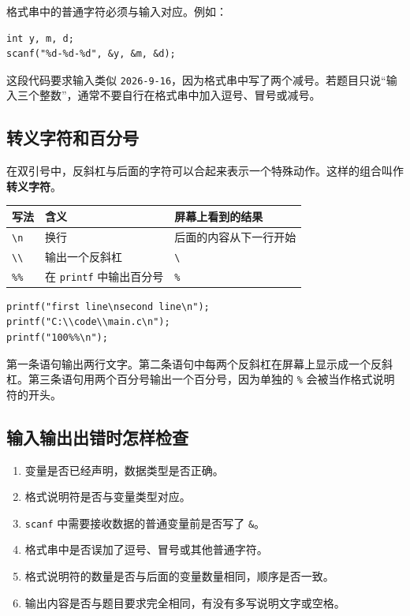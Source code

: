 \documentclass[UTF8,zihao=-4,fontset=windows]{ctexart}
\newcommand{\term}[1]{\textbf{\color{navy}#1}}
\begin{document}
格式串中的普通字符必须与输入对应。例如：
\begin{lstlisting}[style=cstyle]
int y, m, d;
scanf("%d-%d-%d", &y, &m, &d);
\end{lstlisting}

这段代码要求输入类似 \verb|2026-9-16|，因为格式串中写了两个减号。若题目只说“输入三个整数”，通常不要自行在格式串中加入逗号、冒号或减号。

\subsection{转义字符和百分号}

在双引号中，反斜杠与后面的字符可以合起来表示一个特殊动作。这样的组合叫作\term{转义字符}。

\begin{center}
\begin{tabularx}{0.84\textwidth}{>{\centering\arraybackslash}p{2.5cm} X X}
\toprule
写法 & 含义 & 屏幕上看到的结果 \\
\midrule
\texttt{\textbackslash n} & 换行 & 后面的内容从下一行开始 \\
\texttt{\textbackslash\textbackslash} & 输出一个反斜杠 & \texttt{\textbackslash} \\
\texttt{\%\%} & 在 \texttt{printf} 中输出百分号 & \texttt{\%} \\
\bottomrule
\end{tabularx}
\end{center}

\begin{lstlisting}[style=cstyle]
printf("first line\nsecond line\n");
printf("C:\\code\\main.c\n");
printf("100%%\n");
\end{lstlisting}

第一条语句输出两行文字。第二条语句中每两个反斜杠在屏幕上显示成一个反斜杠。第三条语句用两个百分号输出一个百分号，因为单独的 \verb|%| 会被当作格式说明符的开头。

\subsection{输入输出出错时怎样检查}

\begin{enumerate}
  \item 变量是否已经声明，数据类型是否正确。
  \item 格式说明符是否与变量类型对应。
  \item \verb|scanf| 中需要接收数据的普通变量前是否写了 \verb|&|。
  \item 格式串中是否误加了逗号、冒号或其他普通字符。
  \item 格式说明符的数量是否与后面的变量数量相同，顺序是否一致。
  \item 输出内容是否与题目要求完全相同，有没有多写说明文字或空格。
\end{enumerate}
\end{document}
